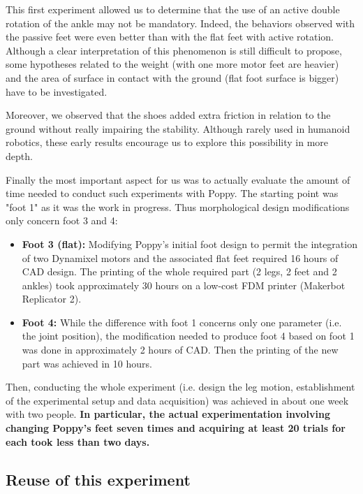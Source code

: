 This first experiment allowed us to determine that the use of an active double rotation of the ankle may not be mandatory. Indeed, the behaviors observed with the passive feet were even better than with the flat feet with active rotation. Although a clear interpretation of this phenomenon is still difficult to propose, some hypotheses related to the weight (with one more motor feet are heavier) and the area of surface in contact with the ground (flat foot surface is bigger) have to be investigated.

Moreover, we observed that the shoes added extra friction in relation to the ground without really impairing the stability. Although rarely used in humanoid robotics, these early results encourage us to explore this possibility in more depth.

Finally the most important aspect for us was to actually evaluate the amount of time needed to conduct such experiments with Poppy. The starting point was "foot 1" as it was the work in progress. Thus morphological design modifications only concern foot 3 and 4:
\begin{itemize}
    \item \textbf{Foot 3 (flat):} Modifying Poppy’s initial foot design to permit the integration of two Dynamixel motors and the associated flat feet required 16 hours of CAD design. The printing of the whole required part (2 legs, 2 feet and 2 ankles) took approximately 30 hours on a low-cost FDM printer (Makerbot Replicator 2).
    \item \textbf{Foot 4:} While the difference with foot 1 concerns only one parameter (i.e. the joint position), the modification needed to produce foot 4 based on foot 1 was done in approximately 2 hours of CAD. Then the printing of the new part was achieved in 10 hours.
\end{itemize}

Then, conducting the whole experiment (i.e. design the leg motion, establishment of the experimental setup and data acquisition) was achieved in about one week with two people. \textbf{In particular, the actual experimentation involving changing Poppy's feet seven times and acquiring at least 20 trials for each took less than two days.}

\subsection{Reuse of this experiment} %

